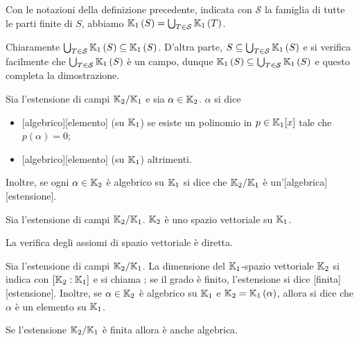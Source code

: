 \begin{Theorem}\label{ThEstensioneUnione}
	Con le notazioni della definizione precedente, indicata con $\mathcal{S}$ la famiglia di tutte le parti finite di $S$, abbiamo $\mathbb{K}_1 \left ( S \right ) = \bigcup_{T \in \mathcal{S}} \mathbb{K}_1 \left ( T \right )$.
\end{Theorem}
\Proof Chiaramente $\bigcup_{T \in \mathcal{S}} \mathbb{K}_1 \left ( S \right ) \subseteq \mathbb{K}_1 \left ( S \right )$. D'altra parte, $S \subseteq \bigcup_{T \in \mathcal{S}} \mathbb{K}_1 \left ( S \right )$ e si verifica facilmente che $\bigcup_{T \in \mathcal{S}} \mathbb{K}_1 \left ( S \right )$ \`e un campo, dunque $\mathbb{K}_1 \left ( S \right ) \subseteq \bigcup_{T \in \mathcal{S}} \mathbb{K}_1 \left ( S \right )$ e questo completa la dimostrazione. \EndProof
\begin{Definition}
	Sia l'estensione di campi $\mathbb{K}_2/\mathbb{K}_1$ e sia $\alpha \in \mathbb{K}_2$. $\alpha$ si dice
	\begin{itemize}
		\item {}[algebrico][elemento] (su $\mathbb{K}_1$) se esiste un polinomio in $p \in \mathbb{K}_1[x]$ tale che $p(\alpha) = 0$;
		\item {}[algebrico][elemento] (su $\mathbb{K}_1$) altrimenti.
	\end{itemize}
	Inoltre, se ogni $\alpha \in \mathbb{K}_2$ \`e algebrico su $\mathbb{K}_1$ si dice che $\mathbb{K}_2/\mathbb{K}_1$ \`e un'[algebrica][estensione].
\end{Definition}
\begin{Theorem}
	Sia l'estensione di campi $\mathbb{K}_2/\mathbb{K}_1$. $\mathbb{K}_2$ \`e uno spazio vettoriale su $\mathbb{K}_1$.
\end{Theorem}
\Proof La verifica degli assiomi di spazio vettoriale \`e diretta. \EndProof
\begin{Definition}
	Sia l'estensione di campi $\mathbb{K}_2/\mathbb{K}_1$. La dimensione del $\mathbb{K}_1$-spazio vettoriale $\mathbb{K}_2$ si indica con $[\mathbb{K}_2:\mathbb{K}_1]$ e si chiama ; se il grado \`e finito, l'estensione si dice [finita][estensione]. Inoltre, se $\alpha \in \mathbb{K}_2$ \`e algebrico su $\mathbb{K}_1$ e $\mathbb{K}_2 = \mathbb{K}_1 \left ( \alpha \right )$, allora si dice che $\alpha$ \`e un elemento  su $\mathbb{K}_1$.
\end{Definition}
\begin{Theorem}
	Se l'estensione $\mathbb{K}_2/\mathbb{K}_1$ \`e finita allora \`e anche algebrica.
\end{Theorem}
